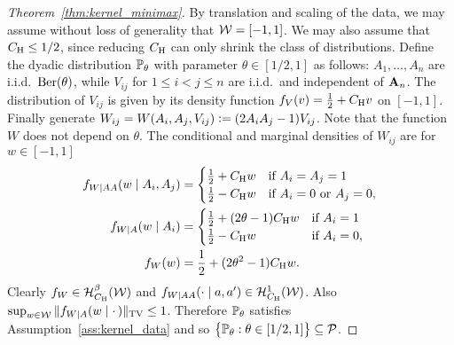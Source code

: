 \begin{proof}[Theorem~\ref{thm:kernel_minimax}]


  By translation and scaling of the data,
  we may assume without loss of generality that $\cW = [-1,1]$.
  We may also assume that $C_\rH \leq 1/2$,
  since reducing $C_\rH$ can only shrink the class of distributions.
  Define the dyadic distribution $\P_\theta$
  with parameter $\theta \in [1/2, 1]$
  as follows:
  $A_1, \ldots, A_n$ are i.i.d.\ $\Ber(\theta)$, while
  $V_{i j}$ for $1 \leq i < j \leq n$ are i.i.d.\
  and independent of $\bA_n$.
  The distribution of $V_{i j}$ is given by its density function
  $f_V(v) = \frac{1}{2} + C_\rH v$ on $[-1,1]$.
  Finally generate
  $W_{i j} = W(A_i, A_j, V_{i j}) \vcentcolon=
  (2 A_i A_j - 1) V_{i j}$.
  Note that the function $W$ does not depend on $\theta$.
  The conditional and marginal densities of $W_{i j}$ are
  for $w \in [-1,1]$
  \begin{align*}
    f_{W \mid AA}(w \mid A_i, A_j)
    &=
    \begin{cases}
      \frac{1}{2} + C_\rH w & \text{if } A_i = A_j = 1                \\
      \frac{1}{2} - C_\rH w & \text{if } A_i = 0 \text{ or } A_j = 0, \\
    \end{cases} \\
    f_{W \mid A}(w \mid A_i)
    &=
    \begin{cases}
      \frac{1}{2} + (2 \theta - 1) C_\rH w
      & \text{if } A_i = 1   \\
      \frac{1}{2} - C_\rH w & \text{if } A_i = 0 , \\
    \end{cases} \\
    f_W(w)&= \frac{1}{2} + (2\theta^2 - 1) C_\rH w.
  \end{align*}
  Clearly
  $f_W \in \cH^\beta_{C_\rH}(\cW)$ and
  $f_{W \mid AA}(\cdot \mid a, a') \in \cH^1_{C_\rH}(\cW)$.
  Also
  $\sup_{w \in \cW} \|f_{W \mid A}(w \mid \cdot\,)\|_\TV \leq 1$.
  Therefore
  $\P_\theta$ satisfies Assumption~\ref{ass:kernel_data}
  and so
  $\big\{\P_\theta : \theta \in [1/2, 1] \big\} \subseteq \cP$.


\end{proof}
